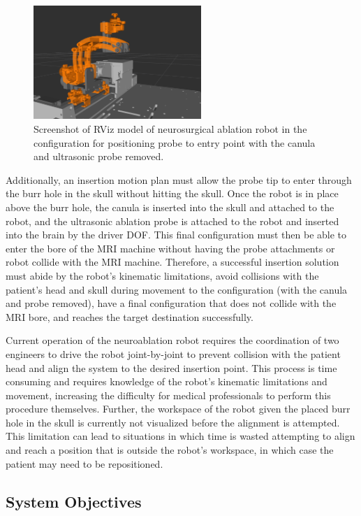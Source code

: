\documentclass[12pt]{report}
\begin{document}
\begin{figure}[thpb]
	\centering
	\includegraphics[width = 2.5in]{images/neuro_no_probe.png}
    \caption{Screenshot of RViz model of neurosurgical ablation robot in the configuration for positioning probe to entry point with the canula and ultrasonic probe removed. }
    \label{fig:neuroRVizModelNoProbe}
\end{figure}

Additionally, an insertion motion plan must allow the probe tip to enter through the burr hole in the skull without hitting the skull. Once the robot is in place above the burr hole, the canula is inserted into the skull and attached to the robot, and the ultrasonic ablation probe is attached to the robot and inserted into the brain by the driver DOF. This final configuration must then be able to enter the bore of the MRI machine without having the probe attachments or robot collide with the MRI machine. Therefore, a successful insertion solution must abide by the robot’s kinematic limitations, avoid collisions with the patient’s head and skull during movement to the configuration (with the canula and probe removed), have a final configuration that does not collide with the MRI bore, and reaches the target destination successfully.

Current operation of the neuroablation robot requires the coordination of two engineers to drive the robot joint-by-joint to prevent collision with the patient head and align the system to the desired insertion point. This process is time consuming and requires knowledge of the robot’s kinematic limitations and movement, increasing the difficulty for medical professionals to perform this procedure themselves. Further, the workspace of the robot given the placed burr hole in the skull is currently not visualized before the alignment is attempted. This limitation can lead to situations in which time is wasted attempting to align and reach a position that is outside the robot’s workspace, in which case the patient may need to be repositioned.

\subsection{System Objectives}
\end{document}
